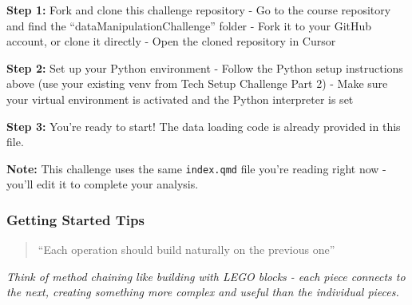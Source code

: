 \documentclass[
  letterpaper,
  DIV=11,
  numbers=noendperiod]{scrartcl}
\begin{document}
\begin{tcolorbox}[enhanced jigsaw, toptitle=1mm, opacityback=0, colframe=quarto-callout-important-color-frame, leftrule=.75mm, arc=.35mm, opacitybacktitle=0.6, breakable, titlerule=0mm, coltitle=black, bottomtitle=1mm, title=\textcolor{quarto-callout-important-color}{\faExclamation}\hspace{0.5em}{📁 Getting Started}, colbacktitle=quarto-callout-important-color!10!white, rightrule=.15mm, left=2mm, bottomrule=.15mm, toprule=.15mm, colback=white]

\textbf{Step 1:} Fork and clone this challenge repository - Go to the
course repository and find the ``dataManipulationChallenge'' folder -
Fork it to your GitHub account, or clone it directly - Open the cloned
repository in Cursor

\textbf{Step 2:} Set up your Python environment - Follow the Python
setup instructions above (use your existing venv from Tech Setup
Challenge Part 2) - Make sure your virtual environment is activated and
the Python interpreter is set

\textbf{Step 3:} You're ready to start! The data loading code is already
provided in this file.

\textbf{Note:} This challenge uses the same \texttt{index.qmd} file
you're reading right now - you'll edit it to complete your analysis.

\end{tcolorbox}

\subsubsection{Getting Started Tips}\label{getting-started-tips}

\begin{tcolorbox}[enhanced jigsaw, toptitle=1mm, opacityback=0, colframe=quarto-callout-note-color-frame, leftrule=.75mm, arc=.35mm, opacitybacktitle=0.6, breakable, titlerule=0mm, coltitle=black, bottomtitle=1mm, title=\textcolor{quarto-callout-note-color}{\faInfo}\hspace{0.5em}{🎯 Method Chaining Philosophy}, colbacktitle=quarto-callout-note-color!10!white, rightrule=.15mm, left=2mm, bottomrule=.15mm, toprule=.15mm, colback=white]

\begin{quote}
``Each operation should build naturally on the previous one''
\end{quote}

\emph{Think of method chaining like building with LEGO blocks - each
piece connects to the next, creating something more complex and useful
than the individual pieces.}

\end{tcolorbox}
\end{document}
